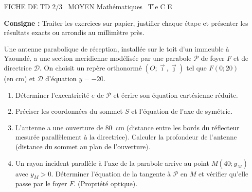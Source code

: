 \documentclass[11pt]{article}
\begin{document}
\begin{tcolorbox}[enhanced,colback=popink,colframe=popink,arc=10pt,boxrule=0pt,left=12pt,right=12pt,top=9pt,bottom=9pt]
{\color{white}\popxbold\small FICHE DE TD 2/3 \textbullet\ MOYEN \hfill Mathématiques \textbullet\ Tle C E\par}
\end{tcolorbox}
\vspace{4pt}
\noindent \textbf{Consigne :} Traiter les exercices sur papier, justifier chaque étape et présenter les résultats exacts ou arrondis au millimètre près.

\begin{exercice}
Une antenne parabolique de réception, installée sur le toit d'un immeuble à Yaoundé, a une section meridienne modélisée par une parabole $\mathcal{P}$ de foyer $F$ et de directrice $\mathcal{D}$. On choisit un repère orthonormé $(O; \vec{\imath}, \vec{\jmath})$ tel que $F(0; 20)$ (en cm) et $\mathcal{D}$ d'équation $y = -20$.
\begin{enumerate}
    \item Déterminer l'excentricité $e$ de $\mathcal{P}$ et écrire son équation cartésienne réduite.
    \item Préciser les coordonnées du sommet $S$ et l'équation de l'axe de symétrie.
    \item L'antenne a une ouverture de \SI{80}{cm} (distance entre les bords du réflecteur mesurée parallèlement à la directrice). Calculer la profondeur de l'antenne (distance du sommet au plan de l'ouverture).
    \item Un rayon incident parallèle à l'axe de la parabole arrive au point $M(40; y_M)$ avec $y_M > 0$. Déterminer l'équation de la tangente à $\mathcal{P}$ en $M$ et vérifier qu'elle passe par le foyer $F$. (Propriété optique).
\end{enumerate}
\end{exercice}
\end{document}
